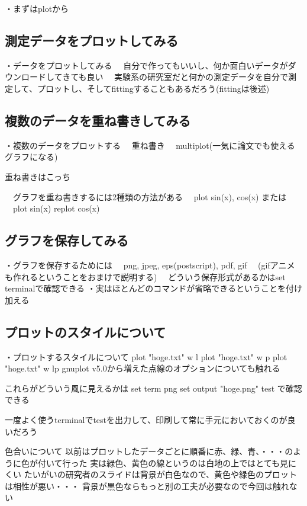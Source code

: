 \documentclass[12pt,a4paper]{jarticle}
\begin{document}
・まずはplotから

\subsection{測定データをプロットしてみる}
・データをプロットしてみる
　自分で作ってもいいし、何か面白いデータがダウンロードしてきても良い
　実験系の研究室だと何かの測定データを自分で測定して、プロットし、そしてfittingすることもあるだろう(fittingは後述)

\subsection{複数のデータを重ね書きしてみる}
・複数のデータをプロットする
　重ね書き
　multiplot(一気に論文でも使えるグラフになる)

重ね書きはこっち

　グラフを重ね書きするには2種類の方法がある
　plot sin(x), cos(x)
または
　plot sin(x)
 replot cos(x)


\subsection{グラフを保存してみる}
・グラフを保存するためには
　png, jpeg, eps(postscript), pdf, gif
　(gifアニメも作れるということをおまけで説明する)
　どういう保存形式があるかはset terminalで確認できる
・実はほとんどのコマンドが省略できるということを付け加える

\subsection{プロットのスタイルについて}
・プロットするスタイルについて
plot "hoge.txt" w l
plot "hoge.txt" w p
plot "hoge.txt" w lp
gnuplot v5.0から増えた点線のオプションについても触れる

これらがどういう風に見えるかは
set term png
set output "hoge.png"
test
で確認できる

一度よく使うterminalでtestを出力して、印刷して常に手元においておくのが良いだろう

色合いについて
以前はプロットしたデータごとに順番に赤、緑、青、・・・のように色が付いて行った
実は緑色、黄色の線というのは白地の上ではとても見にくい
たいがいの研究者のスライドは背景が白色なので、黄色や緑色のプロットは相性が悪い・・・
背景が黒色ならもっと別の工夫が必要なので今回は触れない
\end{document}
